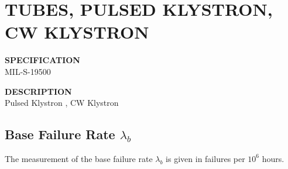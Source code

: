 \section{TUBES, PULSED KLYSTRON, CW KLYSTRON}

\begin{minipage}[t]{0.28\textwidth}
    \textbf{SPECIFICATION}\\
    MIL-S-19500
\end{minipage}
\begin{minipage}[t]{0.7\textwidth}
    \textbf{DESCRIPTION}\\
    {\fontsize{12pt}{12pt}\selectfont Pulsed Klystron , CW Klystron}
\end{minipage}

\subsection{Base Failure Rate $\lambda_b$}
The measurement of the base failure rate $\lambda_b$ is given in failures per $10^6$ hours.
